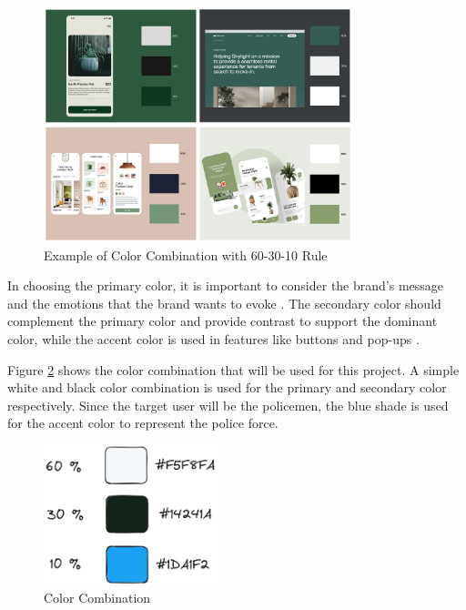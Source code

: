 \begin{figure}[!ht]
    \centering
    \includegraphics[width=0.8\textwidth]{texs/Part2/chapter3/image/colorexample.png}
    \caption{Example of Color Combination with 60-30-10 Rule \cite{M._2023}}
    \label{fig:color-scheme}
\end{figure}

In choosing the primary color, it is important to consider the brand's message and the emotions that the brand wants to evoke \cite{M._2023}. The secondary color should complement the primary color and provide contrast to support the dominant color, while the accent color is used in features like buttons and pop-ups  \cite{M._2023}.

Figure \ref{fig:color-combination} shows the color combination that will be used for this project. A simple white and black color combination is used for the primary and secondary color respectively. Since the target user will be the policemen, the blue shade is used for the accent color to represent the police force.

\begin{figure}[!ht]
    \centering
    \includegraphics[width=0.45\textwidth]{texs/Part2/chapter3/image/colorcombination.png}
    \caption{Color Combination}
    \label{fig:color-combination}
\end{figure}


